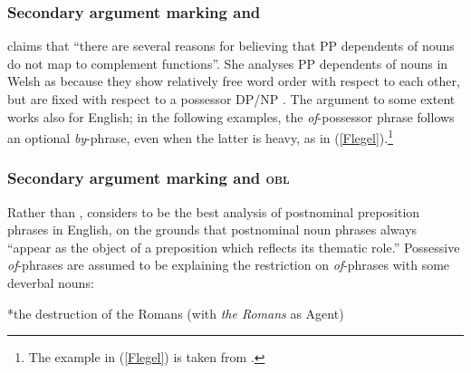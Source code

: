 \documentclass[output=paper,hidelinks]{langscibook}
\begin{document}
\subsubsection{Secondary argument marking and {\ADJ}}

\citet[94]{Sadler00} claims that ``there are several reasons for believing that PP dependents of nouns do not map to complement functions''. She analyses PP dependents of nouns in Welsh as {\ADJ} because they show relatively free word order with respect to each other, but are fixed with respect to a possessor DP/NP \citeyearpar[94--97]{Sadler00}.  The argument to some extent works also for English; in the following examples, the \emph{of}-possessor phrase follows an optional \emph{by}-phrase, even when the latter is heavy, as in (\ref{Flegel}).\footnote{The example in (\ref{Flegel}) is taken from \citet[1379]{Flegel02}.} 

\eal
{}
 \label{Flegel}
\zl

\subsubsection{Secondary argument marking and \textsc{obl}}\label{obl}


Rather than {\ADJ},  \citet[135--136]{Rappaport83} considers {\OBLTHETA} to be the best analysis of postnominal preposition phrases in English, on the grounds that postnominal noun phrases always ``appear as the object of a preposition which reflects its thematic role.'' Possessive \emph{of}-phrases are assumed to be  explaining the restriction on \emph{of}-phrases with some deverbal nouns:



\eal
{}
\zl

\eal
{}
\zl

\ea
*the destruction of the Romans (with \emph{the Romans} as Agent)
\z
\end{document}

